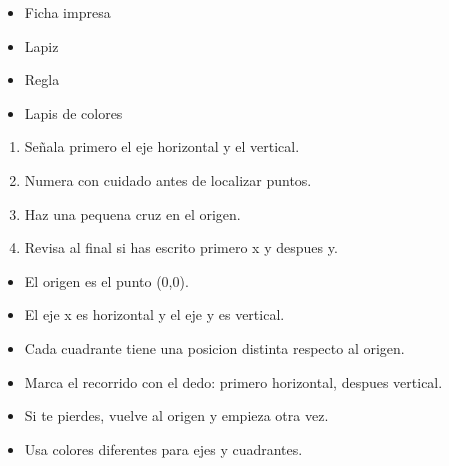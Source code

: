 \documentclass[12pt,a4paper]{article}
\begin{document}
        \FichaCabecera

        \begin{materialesbox}
        \begin{itemize}
    \item Ficha impresa
    \item Lapiz
    \item Regla
    \item Lapis de colores
\end{itemize}
        \end{materialesbox}

        \begin{pasosbox}
        \begin{enumerate}
    \item Señala primero el eje horizontal y el vertical.
    \item Numera con cuidado antes de localizar puntos.
    \item Haz una pequena cruz en el origen.
    \item Revisa al final si has escrito primero x y despues y.
\end{enumerate}
        \end{pasosbox}

        \begin{recordatoriobox}
        \begin{itemize}
    \item El origen es el punto (0,0).
    \item El eje x es horizontal y el eje y es vertical.
    \item Cada cuadrante tiene una posicion distinta respecto al origen.
\end{itemize}
        \end{recordatoriobox}

        \begin{apoyobox}
        \begin{itemize}
    \item Marca el recorrido con el dedo: primero horizontal, despues vertical.
    \item Si te pierdes, vuelve al origen y empieza otra vez.
    \item Usa colores diferentes para ejes y cuadrantes.
\end{itemize}
        \end{apoyobox}


\end{document}
